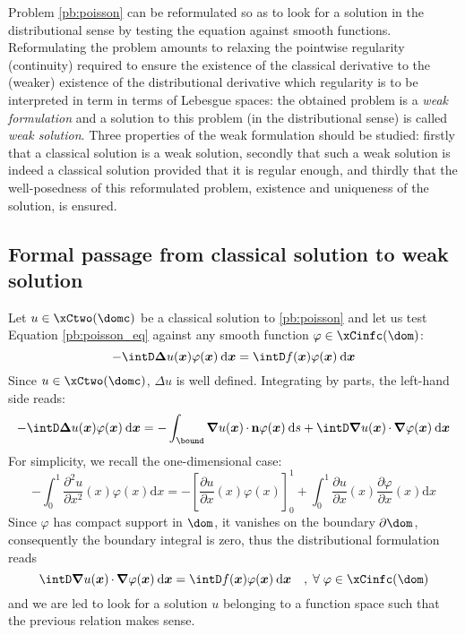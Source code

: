 Problem \eqref{pb:poisson} can be reformulated so as to look for a solution in the distributional sense by testing the equation against smooth functions.
Reformulating the problem amounts to relaxing the pointwise regularity (\ie continuity) required to ensure the existence of the classical derivative to the (weaker) existence of the distributional derivative which regularity is to be interpreted in term in terms of Lebesgue spaces: the obtained problem is a \textit{weak formulation} and a solution to this problem (\ie in the distributional sense) is called \textit{weak solution}.
Three properties of the weak formulation should be studied: firstly that a classical solution is a weak solution, secondly that such a weak solution is indeed a classical solution provided that it is regular enough, and thirdly that the well-posedness of this reformulated problem, \ie existence and uniqueness of the solution, is ensured.


\subsection{Formal passage from classical solution to weak solution}

Let $u \in \xCtwo(\domc)$ be a classical solution to \eqref{pb:poisson} and let us test Equation \eqref{pb:poisson_eq} against any smooth function $\varphi\in\xCinfc(\dom)$:
\begin{equation*}
- \intD \Lap u(\xx) \varphi(\xx) \dxx = \intD f(\xx) \varphi(\xx)  \dxx
\end{equation*}
Since $u \in \xCtwo(\domc)$, $\Delta u$ is well defined. Integrating by parts, the left-hand side reads:
\begin{equation*}
- \intD \Lap u(\xx) \varphi(\xx) \dxx = - \int_\bound \Grad u(\xx) \xDot \n \varphi(\xx) \ds + \intD \Grad u(\xx)\xDot \Grad \varphi(\xx) \dxx
\end{equation*}
For simplicity, we recall the one-dimensional case:
\begin{equation*}
- \int_0^1 \frac{\partial^2 u}{\partial x^2}(x)  \varphi(x) {\mathrm d}x = - \left[ \frac{\partial u}{\partial x}(x) \varphi(x) \right]_0^1 + \int_0^1 \frac{\partial u}{\partial x}(x) \frac{\partial \varphi}{\partial x}(x) {\mathrm d}x
\end{equation*}
Since $\varphi$ has compact support in $\dom$, it vanishes on the boundary $\partial\dom$, consequently the boundary integral is zero, thus the distributional formulation reads
\begin{equation*}
\intD \Grad u(\xx)\xDot \Grad \varphi(\xx) \dxx = \intD f(\xx) \varphi(\xx)  \dxx\quad,\;\forany\varphi\in\xCinfc(\dom)
\end{equation*}
and we are led to look for a solution $u$ belonging to a function space such that the previous relation makes sense.

